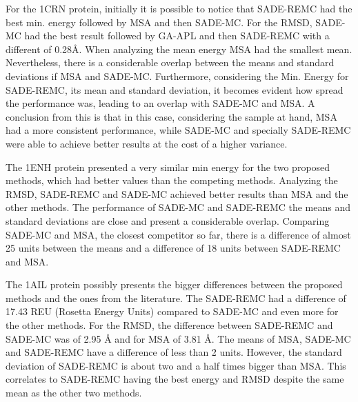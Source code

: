 For the 1CRN protein, initially it is possible to notice that SADE-REMC had the best
min. energy followed by MSA and then SADE-MC. For the \ac{RMSD}, SADE-MC had the best result followed by GA-APL
and then SADE-REMC with a different of 0.28{\AA}. When analyzing the mean energy MSA had the smallest mean.
Nevertheless, there is a considerable overlap between the means and standard deviations if MSA and SADE-MC. 
Furthermore, considering the Min. Energy for SADE-REMC, its mean and standard deviation, it becomes
evident how spread the performance was, leading to an overlap with SADE-MC and MSA.
A conclusion from this is that in this case, considering the sample at hand, MSA had a more consistent
performance, while SADE-MC and specially SADE-REMC were able to achieve better results at the cost of
a higher variance.


The 1ENH protein presented a very similar min energy for the two proposed methods, which had better values than the competing methods. Analyzing the \ac{RMSD}, SADE-REMC and SADE-MC achieved better results than MSA and the other methods.
The performance of SADE-MC and SADE-REMC the means and standard deviations are close and present
a considerable overlap. Comparing SADE-MC and MSA, the closest competitor so far, there is a difference of
almost 25 units between the means and a difference of 18 units between SADE-REMC and MSA.


The 1AIL protein possibly presents the bigger differences between the
proposed methods and the ones from the literature. 
The SADE-REMC had a difference of 17.43 REU (Rosetta Energy
Units) compared to SADE-MC and even more for the other methods.
For the \ac{RMSD}, the difference between SADE-REMC and SADE-MC was of 2.95 {\AA} and for MSA of 3.81 {\AA}.
The means of MSA, SADE-MC and SADE-REMC have a difference of less than 2 units. However, the standard
deviation of SADE-REMC is about two and a half times bigger than MSA. This correlates to
SADE-REMC having the best energy and \ac{RMSD} despite the same mean as the other two methods.

